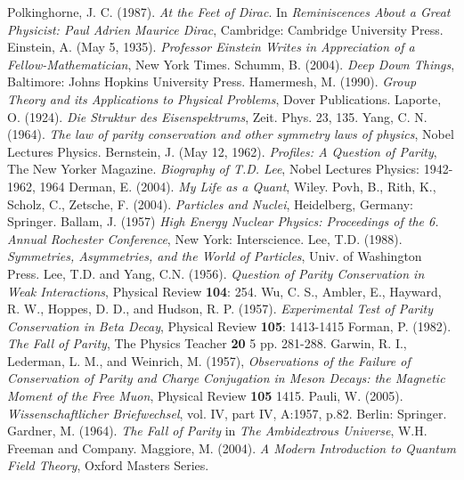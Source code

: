\documentclass[a4paper,12pt]{book}
\begin{document}
\begin{thebibliography}{widest-label}
      Polkinghorne, J. C. (1987). \emph{At the Feet of Dirac}. In \emph{Reminiscences About a Great Physicist: Paul Adrien Maurice Dirac}, Cambridge: Cambridge University Press.	
      Einstein, A. (May 5, 1935). \emph{Professor Einstein Writes in Appreciation of a Fellow-Mathematician}, New York Times.
      Schumm, B. (2004). \emph{Deep Down Things}, Baltimore: Johns Hopkins University Press.
      Hamermesh, M. (1990). \emph{Group Theory and its Applications to Physical Problems}, Dover Publications.
      Laporte, O. (1924). \emph{Die Struktur des Eisenspektrums}, Zeit. Phys. 23, 135.
      Yang, C. N. (1964). \emph{The law of parity conservation and other symmetry laws of physics}, Nobel Lectures Physics.
      Bernstein, J. (May 12, 1962). \emph{Profiles: A Question of Parity}, The New Yorker Magazine.
      \emph{Biography of T.D. Lee}, Nobel Lectures Physics: 1942-1962, 1964
      Derman, E. (2004). \emph{My Life as a Quant}, Wiley.
      Povh, B., Rith, K., Scholz, C., Zetsche, F. (2004). \emph{Particles and Nuclei}, Heidelberg, Germany: Springer. 
      Ballam, J. (1957) \emph{High Energy Nuclear Physics: Proceedings of the 6. Annual Rochester Conference}, New York: Interscience.
      Lee, T.D. (1988). \emph{Symmetries, Asymmetries, and the World of Particles}, Univ. of
Washington Press.
      Lee, T.D. and Yang, C.N. (1956). \emph{Question of Parity Conservation in Weak Interactions}, Physical Review \textbf{104}: 254.
      Wu, C. S., Ambler, E., Hayward, R. W., Hoppes, D. D., and Hudson, R. P. (1957). \emph{Experimental Test of Parity Conservation in Beta Decay}, Physical Review \textbf{105}: 1413-1415
      Forman, P. (1982). \emph{The Fall of Parity}, The Physics Teacher \textbf{20} 5 pp. 281-288.
      Garwin, R. I., Lederman, L. M., and Weinrich, M. (1957), \emph{Observations of the Failure of Conservation of Parity and Charge Conjugation in Meson Decays: the Magnetic Moment of the Free Muon}, Physical Review \textbf{105} 1415.
      Pauli, W. (2005). \emph{Wissenschaftlicher Briefwechsel}, vol. IV, part IV, A:1957, p.82. Berlin: Springer.
      Gardner, M. (1964). \emph{The Fall of Parity} in \emph{The Ambidextrous Universe}, W.H. Freeman and Company.
      Maggiore, M. (2004). \emph{A Modern Introduction to Quantum Field Theory}, Oxford Masters Series.

\end{thebibliography}
\end{document}
